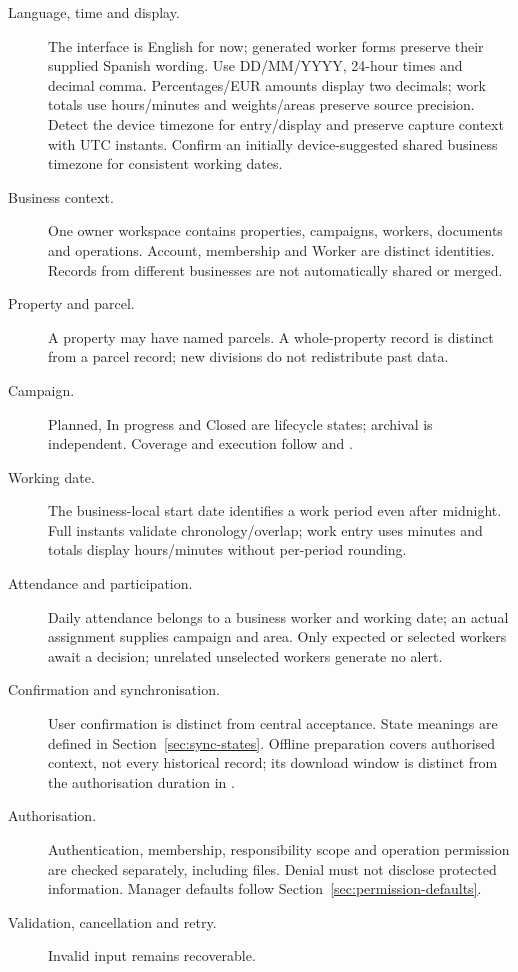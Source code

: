 \begin{description}
\item[Language, time and display.] The interface is English for now; generated
worker forms preserve their supplied Spanish wording. Use DD/MM/YYYY, 24-hour
times and decimal comma. Percentages/EUR amounts display two decimals; work totals
use hours/minutes and weights/areas preserve source precision. Detect the device
timezone for entry/display and preserve capture context with UTC instants. Confirm
an initially device-suggested shared business timezone for consistent working dates.
\item[Business context.] One owner workspace contains properties, campaigns,
workers, documents and operations. Account, membership and Worker are distinct
identities. Records from different businesses are not automatically shared or merged.
\item[Property and parcel.] A property may have named parcels. A whole-property
record is distinct from a parcel record; new divisions do not redistribute past data.
\item[Campaign.] Planned, In progress and Closed are lifecycle states; archival is
independent. Coverage and execution follow \hyperref[br:008]{} and
\hyperref[br:009]{}.
\item[Working date.] The business-local start date identifies a work period even
after midnight. Full instants validate chronology/overlap; work entry uses minutes
and totals display hours/minutes without per-period rounding.
\item[Attendance and participation.] Daily attendance belongs to a business worker
and working date; an actual assignment supplies campaign and area. Only expected
or selected workers await a decision; unrelated unselected workers generate no alert.
\item[Confirmation and synchronisation.] User confirmation is distinct from central
acceptance. State meanings are defined in Section~\ref{sec:sync-states}. Offline
preparation covers authorised context, not every historical record; its download
window is distinct from the authorisation duration in \hyperref[br:002]{}.
\item[Authorisation.] Authentication, membership, responsibility scope and operation
permission are checked separately, including files. Denial must not disclose
protected information. Manager defaults follow Section~\ref{sec:permission-defaults}.
\item[Validation, cancellation and retry.] Invalid input remains recoverable.

\end{description}
